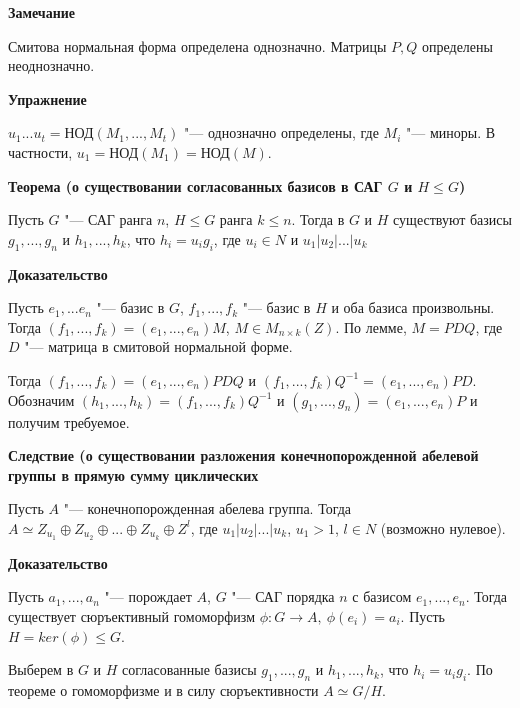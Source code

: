 \documentclass{article}
\begin{document}
\vspace{5pt}

\textbf{Замечание}

Смитова нормальная форма определена однозначно. Матрицы $P, Q$ определены неоднозначно.

\vspace{5pt}

\textbf{Упражнение}

$u_1...u_t = $НОД$(M_1, ..., M_t)$ "--- однозначно определены, где $M_i$ "--- миноры. В частности, $u_1 = $НОД$(M_1) = $НОД$(M)$.

\vspace{10pt}

\textbf{Теорема (о существовании согласованных базисов в САГ $G$ и $H \leq G$)}

Пусть $G$ "--- САГ ранга $n$, $H \leq G$ ранга $k \leq n$. Тогда в $G$ и $H$ существуют базисы $g_1, ..., g_n$ и $h_1, ..., h_k$, что $h_i = u_ig_i$, где $u_i \in N$ и $u_1 | u_2 | ... | u_k$

\vspace{5pt}

\textbf{Доказательство}

Пусть $e_1, ... e_n$ "--- базис в $G$, $f_1, ..., f_k$ "--- базис в $H$ и оба базиса произвольны. Тогда $(f_1, ..., f_k) = (e_1, ..., e_n)M$, $M \in M_{n \times k}(Z)$. По лемме, $M = PDQ$, где $D$ "--- матрица в смитовой нормальной форме. 

Тогда $(f_1, ..., f_k) = (e_1, ..., e_n)PDQ$ и $(f_1, ..., f_k)Q^{-1} = (e_1, ..., e_n)PD$. Обозначим $(h_1, ..., h_k) = (f_1, ..., f_k)Q^{-1}$ и $(g_1, ..., g_n) = (e_1, ..., e_n)P$ и получим требуемое.

\vspace{10pt}

\textbf{Следствие (о существовании разложения конечнопорожденной абелевой группы в прямую сумму циклических}

Пусть $A$ "--- конечнопорожденная абелева группа. Тогда $A \simeq Z_{u_1} \oplus Z_{u_2} \oplus ...  \oplus Z_{u_k} \oplus Z^l$, где $u_1 | u_2 | ... | u_k$, $u_1 > 1$, $l \in N$ (возможно нулевое).

\textbf{Доказательство}

Пусть $a_1, ..., a_n$ "--- порождает $A$, $G$ "--- САГ порядка $n$ с базисом $e_1, ..., e_n$. Тогда существует сюръективный гомоморфизм $\phi: G \rightarrow A, \ \phi(e_i) = a_i$. Пусть $H = ker(\phi) \leq G$.

Выберем в $G$ и $H$ согласованные базисы $g_1, ..., g_n$ и $h_1, ..., h_k$, что $h_i = u_ig_i$. По теореме о гомоморфизме и в силу сюръективности $A \simeq G / H$.
\end{document}
